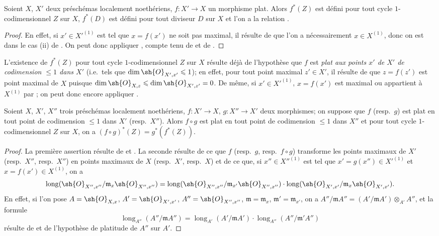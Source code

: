 \begin{proposition}[21.10.6]
\label{IV.21.10.6}
Soient $X$, $X'$ deux préschémas localement noethériens, $f:X'\to X$ un morphisme plat.
Alors $f^*(Z)$ est défini pour tout cycle $1$-codimensionnel $Z$ sur $X$, $f^*(D)$ est défini pour tout diviseur $D$ sur $X$ et l'on a la relation .
\end{proposition}

\begin{proof}
En effet, si $x'\in X'^{(1)}$ est tel que $x=f(x')$ ne soit pas maximal, il résulte de  que l'on a nécessairement $x\in X^{(1)}$, donc on est dans le cas (ii) de .
On peut donc appliquer , compte tenu de  et de .
\end{proof}

\begin{remark}[21.10.7]
\label{IV.21.10.7}
L'existence de $f^*(Z)$ pour tout cycle $1$-codimensionnel $Z$ sur $X$ résulte déjà de l'hypothèse que $f$ est \emph{plat aux points $x'$ de $X'$ de codimension $\leq1$ dans $X'$} (i.e.\ tels que $\dim\sh{O}_{X',x'}\leq1$);
en effet, pour tout point maximal $z'\in X'$, il résulte de  que $z=f(z')$ est point maximal de $X$ puisque $\dim\sh{O}_{X,z}\leq\dim\sh{O}_{X',z'}=0$.
De même, si $x'\in X'^{(1)}$, $x=f(x')$ est maximal ou appartient à $X^{(1)}$ par ;
on peut donc encore appliquer .
\end{remark}

\begin{proposition}[21.10.8]
\label{IV.21.10.8}
Soient $X$, $X'$, $X''$ trois préschémas localement noethériens, $f:X'\to X$, $g:X''\to X'$ deux morphismes;
on suppose que $f$ (resp.\ $g$) est plat en tout point de codimension $\leq1$ dans $X'$ (resp.\ $X''$).
Alors $f\circ g$ est plat en tout point de codimension $\leq1$ dans $X''$ et pour tout cycle $1$-codimensionnel $Z$ sur $X$, on a $(f\circ g)^*(Z)=g^*(f^*(Z))$.
\end{proposition}

\begin{proof}
La première assertion résulte de  et .
La seconde résulte de ce que $f$ (resp.\ $g$, resp.\ $f\circ g$) transforme les points maximaux de $X'$ (resp.\ $X''$, resp.\ $X''$) en points maximaux de $X$ (resp.\ $X'$, resp.\ $X$) et de ce que, si $x''\in X''^{(1)}$ est tel que $x'=g(x'')\in X'^{(1)}$ et $x=f(x')\in X^{(1)}$, on a
\[
  \operatorname{long}(\sh{O}_{X'',x''}/\mathfrak{m}_x\sh{O}_{X'',x''})
  =\operatorname{long}(\sh{O}_{X'',x''}/\mathfrak{m}_{x'}\sh{O}_{X'',x''})
   \cdot\operatorname{long}(\sh{O}_{X',x'}/\mathfrak{m}_x\sh{O}_{X',x'}).
\]
En effet, si l'on pose $A=\sh{O}_{X,x}$, $A'=\sh{O}_{X',x'}$, $A''=\sh{O}_{X'',x''}$, $\mathfrak{m}=\mathfrak{m}_x$, $\mathfrak{m}'=\mathfrak{m}_{x'}$, on a $A''/\mathfrak{m}A''=(A'/\mathfrak{m}A')\otimes_{A'}A''$, et la formule
\[
  \operatorname{long}_{A''}(A''/\mathfrak{m}A'')
  =\operatorname{long}_{A'}(A'/\mathfrak{m}A')
   \cdot\operatorname{long}_{A''}(A''/\mathfrak{m}'A'')
\]
résulte de  et de l'hypothèse de platitude de $A''$ sur $A'$.
\end{proof}

